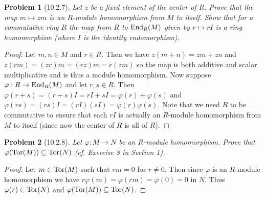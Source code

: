 \documentclass{article}
\newcommand{\tor}{\textup{Tor}}
\newcommand{\End}{\textup{End}}
\newtheorem{problem}{Problem}
\begin{document}
\begin{problem}[10.2.7]
Let $z$ be a fixed element of the center of $R$. Prove that the map $m \mapsto zm$ is an $R$-module homomorphism from $M$ to itself. Show that for a commutative ring $R$ the map from $R$ to $\End_R(M)$ given by $r \mapsto rI$ is a ring homomorphism (where $I$ is the identity endomorphism).
\end{problem}
\begin{proof}
Let $m,n \in M$ and $r \in R$. Then we have $z(m+n) = zm + zn$ and $z(rm) = (zr)m = (rz)m = r(zm)$ so the map is both additive and scalar multiplicative and is thus a module homomorphism. Now suppose $\varphi : R \to \End_R(M)$ and let $r,s \in R$. Then $\varphi(r+s) = (r+s)I = rI + sI = \varphi(r) + \varphi(s)$ and $\varphi(rs) = (rs)I = (rI)(sI) = \varphi(r)\varphi(s)$. Note that we need $R$ to be commutative to ensure that each $rI$ is actually an $R$-module homomorphism from $M$ to itself (since now the center of $R$ is all of $R$).
\end{proof}

\begin{problem}[10.2.8]
Let $\varphi : M \to N$ be an $R$-module homomorphism. Prove that $\varphi(\tor(M)) \subseteq \tor(N)$ (cf. Exercise 8 in Section 1).
\end{problem}
\begin{proof}
Let $m \in \tor(M)$ such that $rm = 0$ for $r \neq 0$. Then since $\varphi$ is an $R$-module homomorphism we have $r\varphi(m) = \varphi(rm) = \varphi(0) = 0$ in $N$. Thus $\varphi(r) \in \tor(N)$ and $\varphi(\tor(M)) \subseteq \tor(N)$.
\end{proof}
\end{document}
